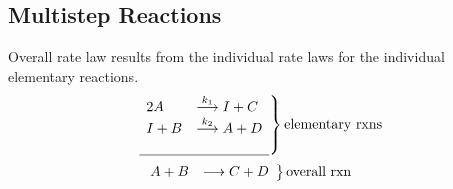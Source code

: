 \subsection{Multistep Reactions}
    Overall rate law results from the individual rate laws for the individual elementary reactions.
    $$
    \left.
        \begin{array}{ll}
            2 A &\overset{k_1}{\longrightarrow} I + C \\
            I + B &\overset{k_2}{\longrightarrow} A + D \\
            \\
            \hline
        \end{array}
    \right\} \text{elementary rxns}
    $$
    $$
    \left.
        \begin{array}{ll}
            A + B &\longrightarrow C + D
        \end{array}
    \right\} \text{overall rxn}\hphantom{\text{rxns}}
    $$    
